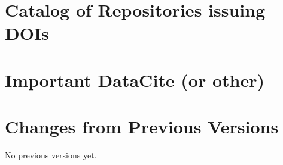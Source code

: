 \documentclass[11pt,a4paper]{ivoa}
\begin{document}
\appendix
\section{Catalog of Repositories issuing DOIs}

\section{Important DataCite (or other) }
\section{Changes from Previous Versions}

No previous versions yet.



\end{document}
